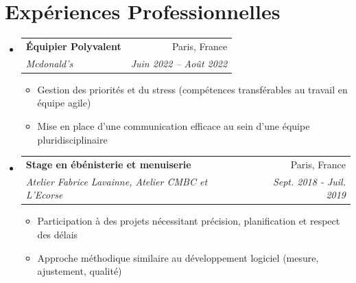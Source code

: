 \documentclass[letterpaper,11pt]{article}
\makeatletter
\newcommand{\resumeItem}[1]{
  \item\small{
    {#1 \vspace{-2pt}}
  }
}
\newcommand{\resumeSubheading}[4]{
  \vspace{-2pt}\item
    \begin{tabular*}{0.97\textwidth}[t]{l@{\extracolsep{\fill}}r}
      \textbf{#1} & #2 \\
      \textit{\small#3} & \textit{\small #4} \\
    \end{tabular*}\vspace{-7pt}
}
\newcommand{\resumeSubHeadingListStart}{\begin{itemize}[leftmargin=0.15in, label={}]}
\newcommand{\resumeSubHeadingListEnd}{\end{itemize}}
\newcommand{\resumeItemListStart}{\begin{itemize}}
\newcommand{\resumeItemListEnd}{\end{itemize}\vspace{-5pt}}
\makeatother
\begin{document}
\section{Expériences Professionnelles}
  \resumeSubHeadingListStart
    \resumeSubheading
      {Équipier Polyvalent}{Paris, France}
      {Mcdonald's}{Juin 2022 -- Août 2022}
      \resumeItemListStart
        \resumeItem{Gestion des priorités et du stress (compétences transférables au travail en équipe agile)}
        \resumeItem{Mise en place d’une communication efficace au sein d’une équipe pluridisciplinaire}
      \resumeItemListEnd
    \resumeSubheading
      {Stage en ébénisterie et menuiserie}{Paris, France}
      {Atelier Fabrice Lavainne, Atelier CMBC et L’Ecorse}{Sept. 2018 - Juil. 2019}
      \resumeItemListStart
        \resumeItem{Participation à des projets nécessitant précision, planification et respect des délais}
        \resumeItem{Approche méthodique similaire au développement logiciel (mesure, ajustement, qualité)}
    \resumeItemListEnd
  \resumeSubHeadingListEnd


\end{document}
